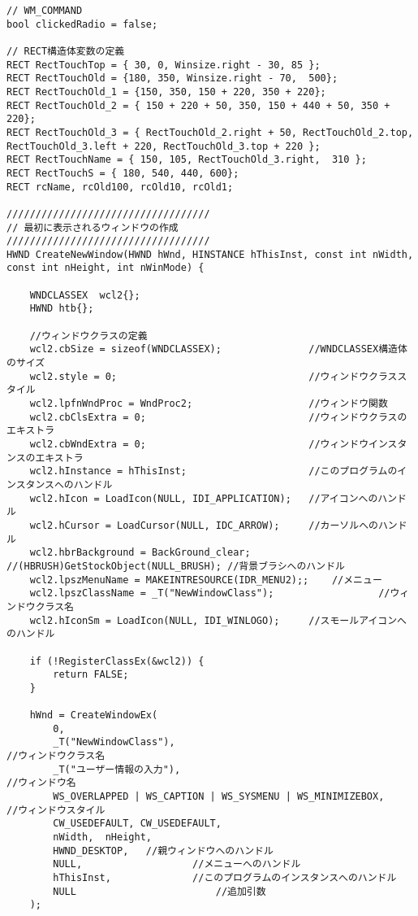 \begin{lstlisting}[caption=UserInfoWindow.cpp]
// WM_COMMAND
bool clickedRadio = false;

// RECT構造体変数の定義
RECT RectTouchTop = { 30, 0, Winsize.right - 30, 85 };
RECT RectTouchOld = {180, 350, Winsize.right - 70,  500};
RECT RectTouchOld_1 = {150, 350, 150 + 220, 350 + 220};
RECT RectTouchOld_2 = { 150 + 220 + 50, 350, 150 + 440 + 50, 350 + 220};
RECT RectTouchOld_3 = { RectTouchOld_2.right + 50, RectTouchOld_2.top, RectTouchOld_3.left + 220, RectTouchOld_3.top + 220 };
RECT RectTouchName = { 150, 105, RectTouchOld_3.right,  310 };
RECT RectTouchS = { 180, 540, 440, 600};
RECT rcName, rcOld100, rcOld10, rcOld1;

///////////////////////////////////
// 最初に表示されるウィンドウの作成
///////////////////////////////////
HWND CreateNewWindow(HWND hWnd, HINSTANCE hThisInst, const int nWidth, const int nHeight, int nWinMode) {

	WNDCLASSEX	wcl2{};
	HWND htb{};

	//ウィンドウクラスの定義
	wcl2.cbSize = sizeof(WNDCLASSEX);				//WNDCLASSEX構造体のサイズ
	wcl2.style = 0;									//ウィンドウクラススタイル
	wcl2.lpfnWndProc = WndProc2;					//ウィンドウ関数
	wcl2.cbClsExtra = 0;							//ウィンドウクラスのエキストラ
	wcl2.cbWndExtra = 0;							//ウィンドウインスタンスのエキストラ
	wcl2.hInstance = hThisInst;						//このプログラムのインスタンスへのハンドル
	wcl2.hIcon = LoadIcon(NULL, IDI_APPLICATION);	//アイコンへのハンドル
	wcl2.hCursor = LoadCursor(NULL, IDC_ARROW);		//カーソルへのハンドル
	wcl2.hbrBackground = BackGround_clear;           //(HBRUSH)GetStockObject(NULL_BRUSH); //背景ブラシへのハンドル
	wcl2.lpszMenuName = MAKEINTRESOURCE(IDR_MENU2);;	//メニュー
	wcl2.lpszClassName = _T("NewWindowClass");					//ウィンドウクラス名
	wcl2.hIconSm = LoadIcon(NULL, IDI_WINLOGO);		//スモールアイコンへのハンドル

	if (!RegisterClassEx(&wcl2)) {
		return FALSE;
	}

	hWnd = CreateWindowEx(
		0,                                                                                            
		_T("NewWindowClass"),                                                                          //ウィンドウクラス名
		_T("ユーザー情報の入力"),				                                                         //ウィンドウ名
		WS_OVERLAPPED | WS_CAPTION | WS_SYSMENU | WS_MINIMIZEBOX,	 //ウィンドウスタイル
		CW_USEDEFAULT, CW_USEDEFAULT,			 
		nWidth,	 nHeight,			    
		HWND_DESKTOP,	//親ウィンドウへのハンドル
		NULL,					//メニューへのハンドル
		hThisInst,				//このプログラムのインスタンスへのハンドル
		NULL					    //追加引数
	);


\end{lstlisting}
